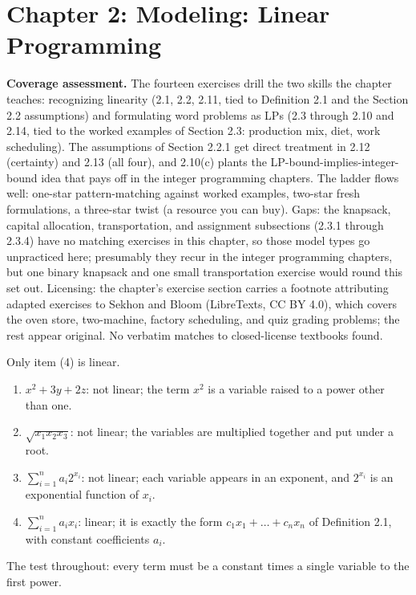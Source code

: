 \section{Chapter 2: Modeling: Linear Programming}

\textbf{Coverage assessment.} The fourteen exercises drill the two skills the chapter teaches: recognizing linearity (2.1, 2.2, 2.11, tied to Definition 2.1 and the Section 2.2 assumptions) and formulating word problems as LPs (2.3 through 2.10 and 2.14, tied to the worked examples of Section 2.3: production mix, diet, work scheduling). The assumptions of Section 2.2.1 get direct treatment in 2.12 (certainty) and 2.13 (all four), and 2.10(c) plants the LP-bound-implies-integer-bound idea that pays off in the integer programming chapters. The ladder flows well: one-star pattern-matching against worked examples, two-star fresh formulations, a three-star twist (a resource you can buy). Gaps: the knapsack, capital allocation, transportation, and assignment subsections (2.3.1 through 2.3.4) have no matching exercises in this chapter, so those model types go unpracticed here; presumably they recur in the integer programming chapters, but one binary knapsack and one small transportation exercise would round this set out. Licensing: the chapter's exercise section carries a footnote attributing adapted exercises to Sekhon and Bloom (LibreTexts, CC BY 4.0), which covers the oven store, two-machine, factory scheduling, and quiz grading problems; the rest appear original. No verbatim matches to closed-license textbooks found.


Only item (4) is linear.
\begin{enumerate}
\item $x^2 + 3y + 2z$: not linear; the term $x^2$ is a variable raised to a power other than one.
\item $\sqrt{x_1 x_2 x_3}$: not linear; the variables are multiplied together and put under a root.
\item $\sum_{i=1}^n a_i 2^{x_i}$: not linear; each variable appears in an exponent, and $2^{x_i}$ is an exponential function of $x_i$.
\item $\sum_{i=1}^n a_i x_i$: linear; it is exactly the form $c_1 x_1 + \dots + c_n x_n$ of Definition 2.1, with constant coefficients $a_i$.
\end{enumerate}
The test throughout: every term must be a constant times a single variable to the first power.

